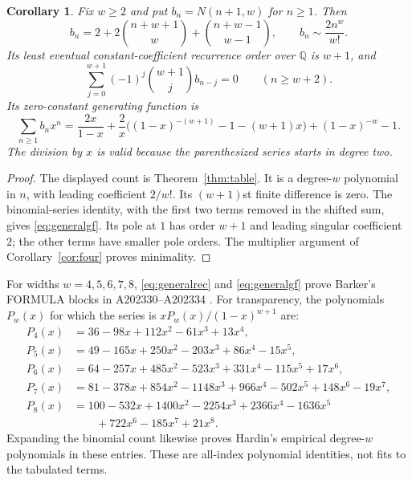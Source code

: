 \documentclass[11pt]{article}
\newtheorem{corollary}[theorem]{Corollary}
\newcommand{\bin}[2]{\binom{#1}{#2}}
\begin{document}
\begin{corollary}\label{cor:width}
Fix $w\ge2$ and put $b_n=N(n+1,w)$ for $n\ge1$. Then
\[
 b_n=2+2\bin{n+w+1}{w}+\bin{n+w-1}{w-1},\qquad
 b_n\sim\frac{2n^w}{w!}.
\]
Its least eventual constant-coefficient recurrence order over $\mathbb Q$ is $w+1$, and
\begin{equation}\label{eq:generalrec}
 \sum_{j=0}^{w+1}(-1)^j\bin{w+1}{j}b_{n-j}=0
                       \qquad(n\ge w+2).
\end{equation}
Its zero-constant generating function is
\begin{equation}\label{eq:generalgf}
 \sum_{n\ge1}b_nx^n=\frac{2x}{1-x}
 +\frac{2}{x}\bigl((1-x)^{-(w+1)}-1-(w+1)x\bigr)
 +(1-x)^{-w}-1.
\end{equation}
The division by $x$ is valid because the parenthesized series starts in degree two.
\end{corollary}
\begin{proof}
The displayed count is Theorem~\ref{thm:table}. It is a degree-$w$ polynomial in $n$, with leading coefficient $2/w!$. Its $(w+1)$st finite difference is zero. The binomial-series identity, with the first two terms removed in the shifted sum, gives \eqref{eq:generalgf}. Its pole at $1$ has order $w+1$ and leading singular coefficient $2$; the other terms have smaller pole orders. The multiplier argument of Corollary~\ref{cor:four} proves minimality.
\end{proof}

For widths $w=4,5,6,7,8$, \eqref{eq:generalrec} and \eqref{eq:generalgf} prove Barker's FORMULA blocks in A202330--A202334 \cite{widths}. For transparency, the polynomials $P_w(x)$ for which the series is $xP_w(x)/(1-x)^{w+1}$ are:
\begin{align*}
P_4(x)&=36-98x+112x^2-61x^3+13x^4,\\
P_5(x)&=49-165x+250x^2-203x^3+86x^4-15x^5,\\
P_6(x)&=64-257x+485x^2-523x^3+331x^4-115x^5+17x^6,\\
P_7(x)&=81-378x+854x^2-1148x^3+966x^4-502x^5+148x^6-19x^7,\\
P_8(x)&=100-532x+1400x^2-2254x^3+2366x^4-1636x^5\\
      &\hspace{2em}+722x^6-185x^7+21x^8.
\end{align*}
Expanding the binomial count likewise proves Hardin's empirical degree-$w$ polynomials in these entries. These are all-index polynomial identities, not fits to the tabulated terms.
\end{document}
